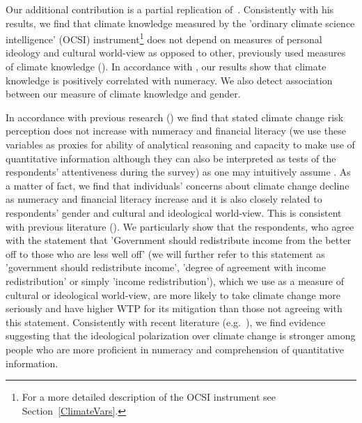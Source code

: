 \documentclass[a4paper,12pt]{article}
\begin{document}
Our additional contribution is a partial replication of~\citet{Kahan2015}. Consistently with his results, we find that climate knowledge measured by the 'ordinary climate science intelligence' (OCSI) instrument\footnote{For a more detailed description of the OCSI instrument see Section~\ref{ClimateVars}.} does not depend on measures of personal ideology and cultural world-view as opposed to other, previously used measures of climate knowledge (\citealp{Hamilton2011, Kahan2012, Kellstedt2008}). In accordance with \cite{Kahan2015}, our results show that climate knowledge is positively correlated with numeracy. We also detect association between our measure of climate knowledge and gender. 

In accordance with previous research (\citealp{KahanEtAl2012, Kahan2015, Kellstedt2008}) we find that stated climate change risk perception does not increase with numeracy and financial literacy (we use these variables as proxies for ability of analytical reasoning and capacity to make use of quantitative information although they can also be interpreted as tests of the respondents' attentiveness during the survey) as one may intuitively assume \citep{Weber2011}. As a matter of fact, we find that individuals' concerns about climate change  decline as numeracy and financial literacy increase and it is also closely related to respondents' gender and cultural and ideological world-view. This is consistent with previous literature (\citealp{Kahan2015, Kellstedt2008, WHITMARSH2011}). We particularly show that the respondents, who agree with the statement that 'Government should redistribute income from the better off to those who are less well off' (we will further refer to this statement as 'government should redistribute income', 'degree of agreement with income redistribution' or simply 'income redistribution'), which we use as a measure of cultural or ideological world-view, are more likely to take climate change more seriously and have higher WTP for its mitigation than those not agreeing with this statement. Consistently with recent literature (e.g.~\citealp{Kahan2015,KahanEtAl2012,Hamilton2011, HamiltonKeim2009}), we find evidence suggesting that the ideological polarization over climate change is stronger among people who are more proficient in numeracy and comprehension of quantitative information. 
\end{document}
